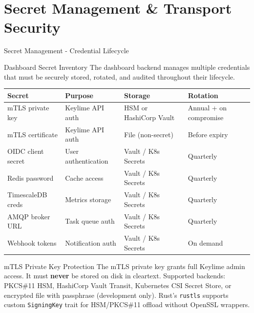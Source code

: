 \section{Secret Management \& Transport Security}

\begin{frame}{Secret Management - Credential Lifecycle}
  \begin{block}{Dashboard Secret Inventory}
    \scriptsize
    The dashboard backend manages multiple credentials that must be securely stored,
    rotated, and audited throughout their lifecycle.
  \end{block}

  \vspace{0.1cm}

  \scriptsize
  \begin{center}
    \begin{tabular}{|l|p{2.5cm}|p{2.5cm}|p{2.5cm}|}
      \hline
      \textbf{Secret} & \textbf{Purpose} & \textbf{Storage} & \textbf{Rotation} \\
      \hline
      \hline
      mTLS private key & Keylime API auth & HSM or HashiCorp Vault & Annual + on compromise \\
      \hline
      mTLS certificate & Keylime API auth & File (non-secret) & Before expiry \\
      \hline
      OIDC client secret & User authentication & Vault / K8s Secrets & Quarterly \\
      \hline
      Redis password & Cache access & Vault / K8s Secrets & Quarterly \\
      \hline
      TimescaleDB creds & Metrics storage & Vault / K8s Secrets & Quarterly \\
      \hline
      AMQP broker URL & Task queue auth & Vault / K8s Secrets & Quarterly \\
      \hline
      Webhook tokens & Notification auth & Vault / K8s Secrets & On demand \\
      \hline
    \end{tabular}
  \end{center}

  \vspace{0.1cm}

  \begin{alertblock}{mTLS Private Key Protection}
    \scriptsize
    The mTLS private key grants full Keylime admin access. It must \textbf{never} be
    stored on disk in cleartext. Supported backends: PKCS\#11 HSM, HashiCorp Vault
    Transit, Kubernetes CSI Secret Store, or encrypted file with passphrase
    (development only). Rust's \texttt{rustls} supports custom \texttt{SigningKey}
    trait for HSM/PKCS\#11 offload without OpenSSL wrappers.
  \end{alertblock}
\end{frame}

